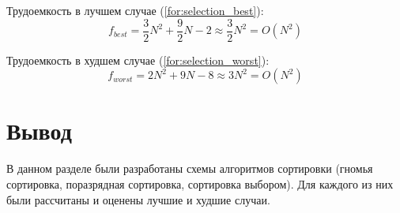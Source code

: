 Трудоемкость в лучшем случае (\ref{for:selection_best}):
\begin{equation}
	\label{for:selection_best}
	f_{best} = \frac{3}{2}N^2 + \frac{9}{2}N - 2\approx \frac{3}{2}N^2 = O(N^2)
\end{equation}

Трудоемкость в худшем случае (\ref{for:selection_worst}):
\begin{equation}
	\label{for:selection_worst}
	f_{worst} = 2N^2 + 9N - 8 \approx 3N^2 = O(N^2)
\end{equation}


\section*{Вывод}

В данном разделе были разработаны схемы алгоритмов сортировки (гномья сортировка, поразрядная сортировка, сортировка выбором). Для каждого из них были рассчитаны и оценены лучшие и худшие случаи.

